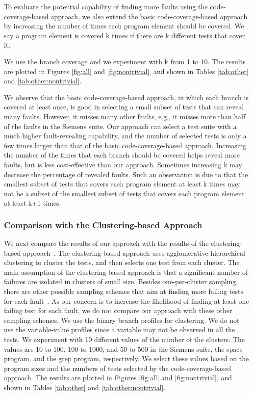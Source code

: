 \documentclass{sig-alternate}
\begin{document}
To evaluate the potential capability of finding more faults using
the code-coverage-based approach, we also extend the basic
code-coverage-based approach by increasing the number of times each
program element should be covered. We say a program element is
covered k times if there are k different tests that cover it.

We use the branch coverage and we experiment with k from 1 to 10.
The results are plotted in Figures \ref{fig:all} and
\ref{fig:nontrivial}, and shown in Tables \ref{tab:other} and
\ref{tab:other:nontrivial}.

We observe that the basic code-coverage-based approach, in which
each branch is covered at least once, is good in selecting a small
subset of tests that can reveal many faults. However, it misses many
other faults, e.g., it misses more than half of the faults in the
Siemens suite. Our approach can select a test suite with a much
higher fault-revealing capability, and the number of selected tests
is only a few times larger than that of the basic
code-coverage-based approach. Increasing the number of the times
that each branch should be covered helps reveal more faults, but is
less cost-effective than our approach. Sometimes increasing k may
decrease the percentage of revealed faults. Such an observation is
due to that the smallest subset of tests that covers each program
element at least k times may not be a subset of the smallest subset
of tests that covers each program element at least k+1 times.



\subsubsection{Comparison with the Clustering-based Approach}

We next compare the results of our approach with the results of the
clustering-based approach~\cite{Dickinson01a}. The clustering-based
approach uses agglomerative hierarchical clustering to cluster the
tests, and then selects one test from each cluster. The main
assumption of the clustering-based approach is that a significant
number of failures are isolated in clusters of small size. Besides
one-per-cluster sampling, there are other possible sampling schemes
that aim at finding more failing tests for each
fault~\cite{Dickinson01b}. As our concern is to increase the
likelihood of finding at least one failing test for each fault, we
do not compare our approach with these other sampling schemes. We
use the binary branch profiles for clustering. We do not use the
variable-value profiles since a variable may not be observed in all
the tests. We experiment with 10 different values of the number of
the clusters. The values are 10 to 100, 100 to 1000, and 50 to 500
in the Siemens suite, the space program, and the grep program,
respectively. We select these values based on the program sizes and
the numbers of tests selected by the code-coverage-based approach.
The results are plotted in Figures \ref{fig:all} and
\ref{fig:nontrivial}, and shown in Tables \ref{tab:other} and
\ref{tab:other:nontrivial}.
\end{document}
